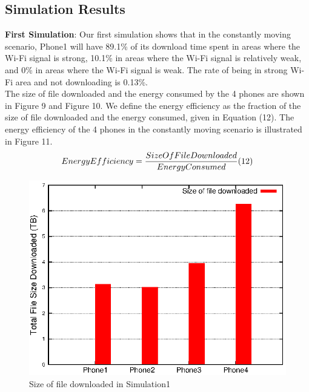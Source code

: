 \documentclass[journal]{IEEEtran}
\begin{document}
\subsection{Simulation Results}
{\bf First Simulation}: 
Our first simulation shows that in the constantly moving scenario, Phone1 will have 89.1\% of its download time spent in areas where the Wi-Fi signal is 
strong, 10.1\% in areas where the Wi-Fi signal is relatively weak, and 0\% in areas where the Wi-Fi signal is weak. The rate of being in 
strong Wi-Fi area and not downloading is 0.13\%.
\\
\indent
The size of file downloaded and the energy consumed by the 4 phones are shown in Figure 9 and Figure 10. We define the energy efficiency as 
the fraction of the size of file downloaded and the energy consumed, given in Equation (12). The energy efficiency of the 4 phones in the constantly moving scenario
is illustrated in Figure 11. 
$$ 
EnergyEfficiency = \frac{SizeOfFileDownloaded}{EnergyConsumed}	
\relax(12)
$$
\begin{figure}
\centering
\includegraphics[scale=0.85]{result_directional_downloadsize.eps}
\caption{Size of file downloaded in Simulation1}
\end{figure}
\end{document}
